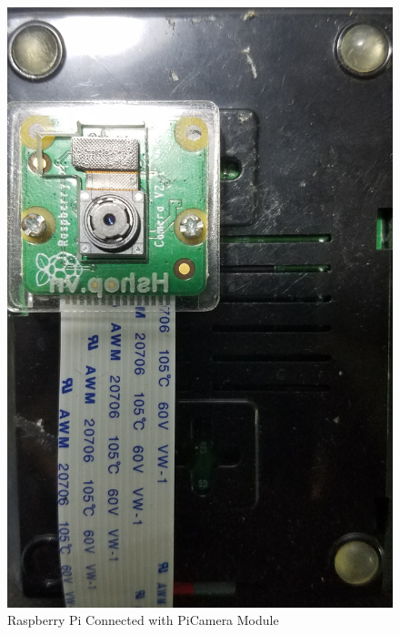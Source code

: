   \begin{figure}[!ht]
    \begin{center}
    \includegraphics[scale=0.15]{images/piAndCam.jpg}
    \caption{Raspberry Pi Connected with PiCamera Module}
    \label{fig:piAndCam}
    \end{center}
  \end{figure}